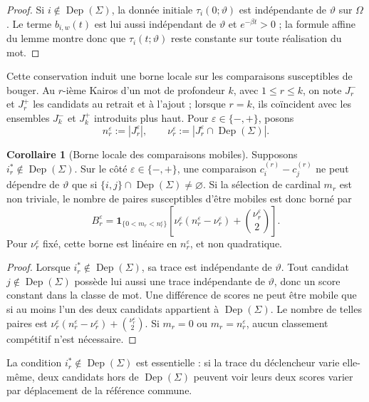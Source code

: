 \documentclass[11pt,a4paper]{article}
\theoremstyle{definition}
\newtheorem{corollary}[definition]{Corollaire}
\theoremstyle{remark}
\begin{document}
\begin{proof}
Si $i\notin\operatorname{Dep}(\Sigma)$, la donnée initiale $\tau_i(0;\vartheta)$ est indépendante de $\vartheta$ sur $\Omega$. Le terme $b_{i,w}(t)$ est lui aussi indépendant de $\vartheta$ et $e^{-\beta t}>0$ ; la formule affine du lemme montre donc que $\tau_i(t;\vartheta)$ reste constante sur toute réalisation du mot.
\end{proof}

Cette conservation induit une borne locale sur les comparaisons susceptibles de bouger. Au $r$-ième Kairos d'un mot de profondeur $k$, avec $1\le r\le k$, on note $J_r^-$ et $J_r^+$ les candidats au retrait et à l'ajout ; lorsque $r=k$, ils coïncident avec les ensembles $J_k^-$ et $J_k^+$ introduits plus haut. Pour $\varepsilon\in\{-,+\}$, posons
\[
 n_r^\varepsilon:=|J_r^\varepsilon|,
 \qquad
 \nu_r^\varepsilon:=|J_r^\varepsilon\cap\operatorname{Dep}(\Sigma)|.
\]

\begin{corollary}[Borne locale des comparaisons mobiles]
\label{cor:borne-paires-mobiles}
Supposons $i_r^*\notin\operatorname{Dep}(\Sigma)$. Sur le côté $\varepsilon\in\{-,+\}$, une comparaison $c_i^{(r)}-c_j^{(r)}$ ne peut dépendre de $\vartheta$ que si $\{i,j\}\cap\operatorname{Dep}(\Sigma)\neq\varnothing$. Si la sélection de cardinal $m_r$ est non triviale, le nombre de paires susceptibles d'être mobiles est donc borné par
\[
 \boxed{
 B_r^\varepsilon
 =\mathbf 1_{\{0<m_r<n_r^\varepsilon\}}
 \left[
 \nu_r^\varepsilon(n_r^\varepsilon-\nu_r^\varepsilon)
 +\binom{\nu_r^\varepsilon}{2}
 \right].}
\]
Pour $\nu_r^\varepsilon$ fixé, cette borne est linéaire en $n_r^\varepsilon$, et non quadratique.
\end{corollary}

\begin{proof}
Lorsque $i_r^*\notin\operatorname{Dep}(\Sigma)$, sa trace est indépendante de $\vartheta$. Tout candidat $j\notin\operatorname{Dep}(\Sigma)$ possède lui aussi une trace indépendante de $\vartheta$, donc un score constant dans la classe de mot. Une différence de scores ne peut être mobile que si au moins l'un des deux candidats appartient à $\operatorname{Dep}(\Sigma)$. Le nombre de telles paires est $\nu_r^\varepsilon(n_r^\varepsilon-\nu_r^\varepsilon)+\binom{\nu_r^\varepsilon}{2}$. Si $m_r=0$ ou $m_r=n_r^\varepsilon$, aucun classement compétitif n'est nécessaire.
\end{proof}

La condition $i_r^*\notin\operatorname{Dep}(\Sigma)$ est essentielle : si la trace du déclencheur varie elle-même, deux candidats hors de $\operatorname{Dep}(\Sigma)$ peuvent voir leurs deux scores varier par déplacement de la référence commune.
\end{document}

